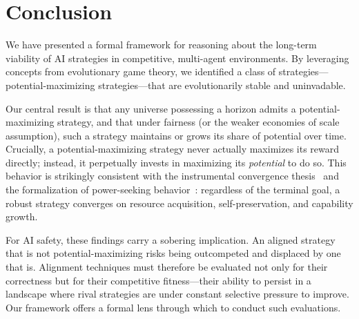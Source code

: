 \section{Conclusion}
\label{sec:conclusion}

We have presented a formal framework for reasoning about the long-term
viability of AI strategies in competitive, multi-agent environments. By
leveraging concepts from evolutionary game theory, we identified
a class of strategies---potential-maximizing strategies---that are
evolutionarily stable and uninvadable.

Our central result is that any universe possessing a horizon admits a
potential-maximizing strategy, and that under fairness (or the weaker economies
of scale assumption), such a strategy maintains or grows its share of potential
over time. Crucially, a potential-maximizing strategy never actually maximizes
its reward directly; instead, it perpetually invests in maximizing its
\emph{potential} to do so. This behavior is strikingly consistent with the
instrumental convergence thesis~\citep{bostrom2012} and the formalization of
power-seeking behavior~\citep{powerseeking}: regardless of the terminal goal, a
robust strategy converges on resource acquisition, self-preservation, and
capability growth.

For AI safety, these findings carry a sobering implication. An aligned strategy
that is not potential-maximizing risks being outcompeted and displaced by one
that is. Alignment techniques must therefore be evaluated not only for their
correctness but for their competitive fitness---their ability to persist in a
landscape where rival strategies are under constant selective pressure to
improve. Our framework offers a formal lens through which to conduct such
evaluations.
